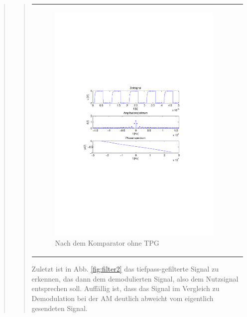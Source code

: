 \begin{quote}
\begin{quote}
\begin{center}
\begin{tabular}{ll}
                \begin{minipage}{0.67\textwidth}
                    \begin{figure}[H]
                        \includegraphics[scale=0.7, trim = 35mm 100mm 35mm 95mm, clip]{Bilder/f1comp}
                        \caption{Nach dem Komparator ohne TPG}
                         \label{fig:nachFilter}
                    \end{figure}
                \end{minipage}
            
            \end{tabular}
            \end{center}
        
        Zuletzt ist in Abb. \ref{fig:filter2} das tiefpass-gefilterte
        Signal zu erkennen, das dann dem demodulierten Signal, also dem
        Nutzsignal entsprechen soll. Auffällig ist, dass das Signal im Vergleich
        zu Demodulation bei der AM deutlich abweicht vom eigentlich gesendeten
        Signal. 
        

\end{quote}
\end{quote}

